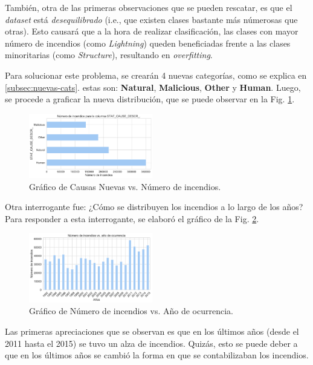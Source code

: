 También, otra de las primeras observaciones que se pueden rescatar, es que el \textit{dataset} está \textit{desequilibrado} (i.e., que existen clases bastante más númerosas que otras). Esto causará que a la hora de realizar clasificación, las clases con mayor número de incendios (como \textit{Lightning}) queden beneficiadas frente a las clases minoritarias (como \textit{Structure}), resultando en \textit{overfitting}.

Para solucionar este problema, se crearán 4 nuevas categorías, como se explica en \ref{subsec:nuevas-cats}. estas son: \textbf{Natural}, \textbf{Malicious}, \textbf{Other} y \textbf{Human}. Luego, se procede a graficar la nueva distribución, que se puede observar en la Fig. \ref{fig:SCDN}.

\begin{figure}
    \centering
    \includegraphics[width=0.48\textwidth]{imagenes/barh_STAT_CAUSE_DESCR_.pdf}
    \caption{Gráfico de Causas Nuevas vs. Número de incendios.}
    \label{fig:SCDN}
\end{figure}

Otra interrogante fue: ¿Cómo se distribuyen los incendios a lo largo de los años? Para responder a esta interrogante, se elaboró el gráfico de la Fig. \ref{fig:Year-Ocurr}.

\begin{figure}
    \centering
    \includegraphics[width=0.48\textwidth]{imagenes/YEAR_OCURRENCIA.pdf}
    \caption{Gráfico de Número de incendios vs. Año de ocurrencia.}
    \label{fig:Year-Ocurr}
\end{figure}

Las primeras apreciaciones que se observan es que en los últimos años (desde el 2011 hasta el 2015) se tuvo un alza de incendios. Quizás, esto se puede deber a que en los últimos años se cambió la forma en que se contabilizaban los incendios.

